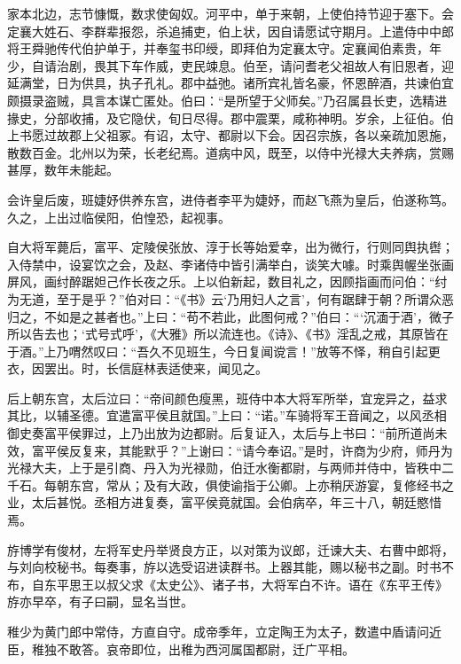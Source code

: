\documentclass[12pt,UTF8]{ctexbook}
\begin{document}
家本北边，志节慷慨，数求使匈奴。河平中，单于来朝，上使伯持节迎于塞下。会定襄大姓石、李群辈报怨，杀追捕吏，伯上状，因自请愿试守期月。上遣侍中中郎将王舜驰传代伯护单于，并奉玺书印绶，即拜伯为定襄太守。定襄闻伯素贵，年少，自请治剧，畏其下车作威，吏民竦息。伯至，请问耆老父祖故人有旧恩者，迎延满堂，日为供具，执子孔礼。郡中益弛。诸所宾礼皆名豪，怀恩醉酒，共谏伯宜颇摄录盗贼，具言本谋亡匿处。伯曰：“是所望于父师矣。”乃召属县长吏，选精进掾史，分部收捕，及它隐伏，旬日尽得。郡中震栗，咸称神明。岁余，上征伯。伯上书愿过故郡上父祖冢。有诏，太守、都尉以下会。因召宗族，各以亲疏加恩施，散数百金。北州以为荣，长老纪焉。道病中风，既至，以侍中光禄大夫养病，赏赐甚厚，数年未能起。



会许皇后废，班婕妤供养东宫，进侍者李平为婕妤，而赵飞燕为皇后，伯遂称笃。久之，上出过临侯阳，伯惶恐，起视事。



自大将军薨后，富平、定陵侯张放、淳于长等始爱幸，出为微行，行则同舆执辔；入侍禁中，设宴饮之会，及赵、李诸侍中皆引满举白，谈笑大噱。时乘舆幄坐张画屏风，画纣醉踞妲己作长夜之乐。上以伯新起，数目礼之，因顾指画而问伯：“纣为无道，至于是乎？”伯对曰：“《书》云‘乃用妇人之言’，何有踞肆于朝？所谓众恶归之，不如是之甚者也。”上曰：“苟不若此，此图何戒？”伯曰：“‘沉湎于酒’，微子所以告去也；‘式号式呼’，《大雅》所以流连也。《诗》、《书》淫乱之戒，其原皆在于酒。”上乃喟然叹曰：“吾久不见班生，今日复闻谠言！”放等不怿，稍自引起更衣，因罢出。时，长信庭林表适使来，闻见之。



后上朝东宫，太后泣曰：“帝间颜色瘦黑，班侍中本大将军所举，宜宠异之，益求其比，以辅圣德。宜遣富平侯且就国。”上曰：“诺。”车骑将军王音闻之，以风丞相御史奏富平侯罪过，上乃出放为边都尉。后复证入，太后与上书曰：“前所道尚未效，富平侯反复来，其能默乎？”上谢曰：“请今奉诏。”是时，许商为少府，师丹为光禄大夫，上于是引商、丹入为光禄勋，伯迁水衡都尉，与两师并侍中，皆秩中二千石。每朝东宫，常从；及有大政，俱使谕指于公卿。上亦稍厌游宴，复修经书之业，太后甚悦。丞相方进复奏，富平侯竟就国。会伯病卒，年三十八，朝廷愍惜焉。



斿博学有俊材，左将军史丹举贤良方正，以对策为议郎，迁谏大夫、右曹中郎将，与刘向校秘书。每奏事，斿以选受诏进读群书。上器其能，赐以秘书之副。时书不布，自东平思王以叔父求《太史公》、诸子书，大将军白不许。语在《东平王传》斿亦早卒，有子曰嗣，显名当世。



稚少为黄门郎中常侍，方直自守。成帝季年，立定陶王为太子，数遣中盾请问近臣，稚独不敢答。哀帝即位，出稚为西河属国都尉，迁广平相。
\end{document}
